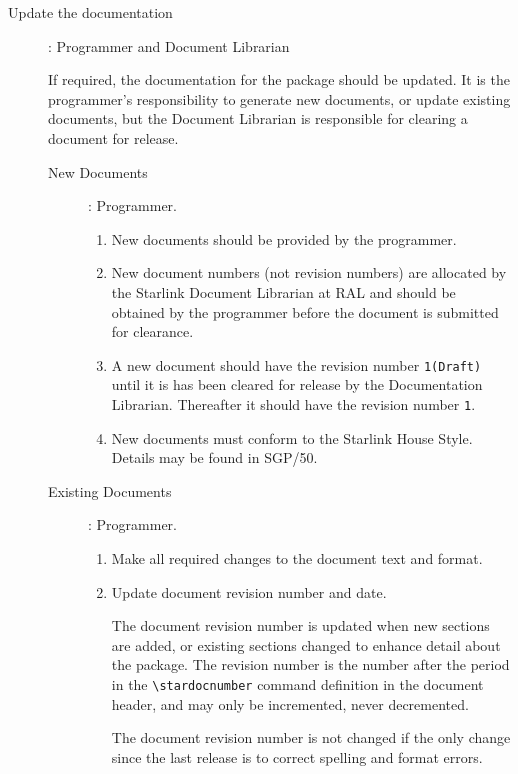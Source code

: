 \documentclass[twoside,11pt]{article}
\newcommand{\stardocnumber}    {51.1}
\newcommand{\xref}[3]{#1}
\begin{document}
\begin{description}
\item[Update the documentation]: Programmer and Document Librarian

If required, the documentation for the package should be updated.  It
is the programmer's responsibility to generate new documents, or
update existing documents, but the Document Librarian is
responsible for clearing a document for release.

\begin{description}

\item [New Documents]:  Programmer.

\begin{enumerate}

\item New documents should be provided by the programmer.

\item New document numbers (not revision numbers) are allocated by the
Starlink Document Librarian at RAL and should be obtained by the
programmer before the document is submitted for clearance.

\item A new document should have the revision number {\tt{1(Draft)}}
until it is has been cleared for release by the Documentation
Librarian.  Thereafter it should have the revision number {\tt{1}}.

\item New documents must conform to the Starlink House Style.  Details
may be found in \xref{SGP/50}{sgp50}{}.

\end{enumerate}

\item [Existing Documents]: Programmer.

\begin{enumerate}

\item Make all required changes to the document text and format.

\item Update document revision number and date.

The document revision number is updated when new sections are
added, or existing sections changed to enhance detail about the
package.  The revision number is the number after the period in the
{\verb+\stardocnumber+} command definition in the document header, and
may only be incremented, never decremented.

The document revision number is not changed if the only change since
the last release is to correct spelling and format errors. 


\end{enumerate}
\end{description}
\end{description}
\end{document}
